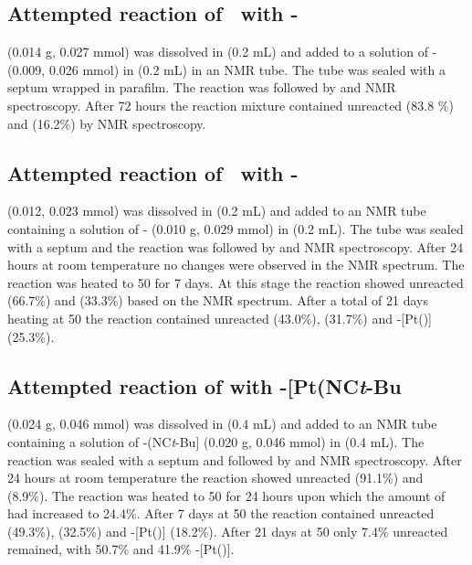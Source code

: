 \subsection*{Attempted reaction of \tButhixantphos\ with \cis-}

\tBuThixantphos{} (0.014 g, 0.027 mmol) was dissolved in  (0.2 mL) and added to a solution of \cis- (0.009, 0.026 mmol) in  (0.2 mL) in an NMR tube.  The tube was sealed with a septum wrapped in parafilm.  The reaction was followed by \proton{} and \phosphorus{} NMR spectroscopy.  After 72 hours the reaction mixture contained unreacted \tButhixantphos{} (83.8 \%) and \tButhixantphos{}  (16.2\%) by \phosphorus{} NMR spectroscopy.  

\subsection*{Attempted reaction of \tButhixantphos\ with \trans-}

\tBuThixantphos{} (0.012, 0.023 mmol) was dissolved in  (0.2 mL) and added to an NMR tube containing a solution of \trans- (0.010 g, 0.029 mmol) in  (0.2 mL). The tube was sealed with a septum and the reaction was followed by \proton{} and \phosphorus{} NMR spectroscopy.  After 24 hours at room temperature no changes were observed in the NMR spectrum.  The reaction was heated to 50 \degC{} for 7 days.  At this stage the reaction showed unreacted \tButhixantphos{} (66.7\%) and \tButhixantphos{} (33.3\%) based on the \phosphorus{} NMR spectrum.  After a total of 21 days heating at 50 \degC{} the reaction contained unreacted \tButhixantphos{} (43.0\%), \tButhixantphos{} (31.7\%) and \trans-[Pt(\tButhixantphos)] (25.3\%).  

\subsection*{Attempted reaction of \tButhixantphos{} with \trans-[Pt(NC\emph{t}-Bu\ce{)2]}}

\tBuThixantphos{} (0.024 g, 0.046 mmol) was dissolved in  (0.4 mL) and added to an NMR tube containing a solution of \trans-\ce{[PtCl2}(NC\emph{t}-Bu] (0.020 g, 0.046 mmol) in  (0.4 mL).  The reaction was sealed with a septum and followed by \proton{} and \phosphorus{} NMR spectroscopy.  After 24 hours at room temperature the reaction showed unreacted \tButhixantphos{} (91.1\%) and \tButhixantphos{} (8.9\%).  The reaction was heated to 50 \degC{} for 24 hours upon which the amount of \tButhixantphos{} had increased to 24.4\%.  After 7 days at 50 \degC{} the reaction contained unreacted \tButhixantphos{} (49.3\%), \tButhixantphos{} (32.5\%) and \trans-[Pt(\tButhixantphos)] (18.2\%).  After 21 days at 50 \degC{} only 7.4\% unreacted \tButhixantphos{} remained, with 50.7\% \tButhixantphos{} and 41.9\% \trans-[Pt(\tButhixantphos)].  

